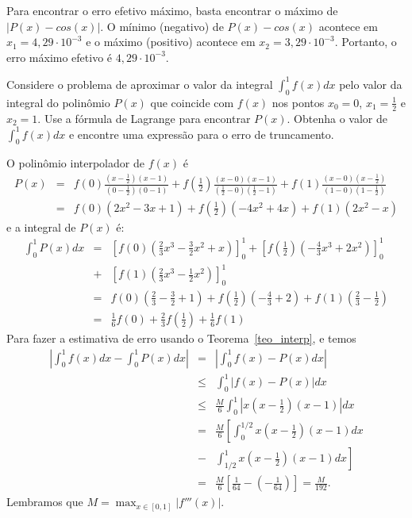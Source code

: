 Para encontrar o erro efetivo máximo, basta encontrar o máximo de $|P(x)-cos(x)|$. O mínimo (negativo) de $P(x)-cos(x)$ acontece em $x_1=4,29\cdot 10^{-3}$ e o máximo (positivo) acontece em $x_2=3,29\cdot 10^{-3}$. Portanto, o erro máximo efetivo é $4,29\cdot 10^{-3}$.

\begin{ex}\label{exemp_simpson}
Considere o problema de aproximar o valor da integral $\int_0^1 f(x)dx$ pelo valor da integral do polinômio $P(x)$ que coincide com $f(x)$ nos pontos $x_0=0$, $x_1=\frac{1}{2}$ e $x_2=1$. Use a fórmula de Lagrange para encontrar $P(x)$. Obtenha o valor de $\int_0^1f(x)dx$ e encontre uma expressão para o erro de truncamento.
\end{ex}
O polinômio interpolador de $f(x)$ é
\begin{eqnarray*}
P(x)&=&f(0)\frac{(x-\frac{1}{2})(x-1)}{(0-\frac{1}{2})(0-1)}+f\left(\frac{1}{2}\right)\frac{(x-0)(x-1)}{(\frac{1}{2}-0)(\frac{1}{2}-1)}+f(1)\frac{(x-0)(x-\frac{1}{2})}{(1-0)(1-\frac{1}{2})}\\
&=&   f(0)(2x^2-3x+1)+f\left(\frac{1}{2}\right)(-4x^2+4x)+f(1)(2x^2-x)
\end{eqnarray*}
e a integral de $P(x)$ é:
\begin{eqnarray*}
\int_0^1 P(x)dx &=& \left[f(0)\left(\frac{2}{3}x^3 - \frac{3}{2}x^2+x\right)\right]_0^1 + \left[f\left(\frac{1}{2}\right)\left(-\frac{4}{3}x^3+2x^2\right)\right]_0^1 \\
&+& \left[f(1)\left(\frac{2}{3}x^3-\frac{1}{2}x^2\right)\right]_0^1\\
&=& f(0)\left(\frac{2}{3}-\frac{3}{2}+1\right)+f\left(\frac{1}{2}\right)\left(-\frac{4}{3}+2\right)+f(1)\left(\frac{2}{3}-\frac{1}{2}\right)\\
&=& \frac{1}{6}f(0)+\frac{2}{3}f\left(\frac{1}{2}\right)+\frac{1}{6}f(1)
\end{eqnarray*}
Para fazer a estimativa de erro usando o Teorema~\ref{teo_interp}, e temos
\begin{eqnarray*}
\left|\int_0^1f(x)dx-\int_0^1 P(x)dx\right|&=&\left|\int_0^1f(x)- P(x)dx\right|\\
&\leq&\int_0^1|f(x)- P(x)|dx\\
&\leq& \frac{M}{6}  \int_0^1\left|x\left(x-\frac{1}{2}\right)(x-1)\right|dx\\
&=& \frac{M}{6}  \left[\int_0^{1/2}x\left(x-\frac{1}{2}\right)(x-1)dx\right.\\
&-&\left.\int_{1/2}^1x\left(x-\frac{1}{2}\right)(x-1)dx\right]\\
&=& \frac{M}{6}  \left[\frac{1}{64}-\left(-\frac{1}{64}\right)\right]=\frac{M}{192}.
\end{eqnarray*}
Lembramos que $M=\max_{x\in[0,1]}|f'''(x)|$.

